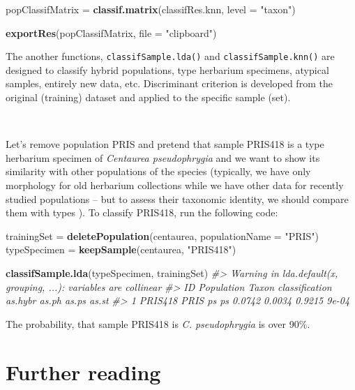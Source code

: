 \documentclass[
]{article}
\newenvironment{Shaded}{\begin{snugshade}}{\end{snugshade}}
\newcommand{\CommentTok}[1]{\textcolor[rgb]{0.56,0.35,0.01}{\textit{#1}}}
\newcommand{\DataTypeTok}[1]{\textcolor[rgb]{0.13,0.29,0.53}{#1}}
\newcommand{\KeywordTok}[1]{\textcolor[rgb]{0.13,0.29,0.53}{\textbf{#1}}}
\newcommand{\NormalTok}[1]{#1}
\newcommand{\StringTok}[1]{\textcolor[rgb]{0.31,0.60,0.02}{#1}}
\begin{document}
\begin{Shaded}
\begin{Highlighting}[]
\NormalTok{popClassifMatrix =}\StringTok{ }\KeywordTok{classif.matrix}\NormalTok{(classifRes.knn, }\DataTypeTok{level =} \StringTok{"taxon"}\NormalTok{)}

\KeywordTok{exportRes}\NormalTok{(popClassifMatrix, }\DataTypeTok{file =} \StringTok{"clipboard"}\NormalTok{)}
\end{Highlighting}
\end{Shaded}

The another functions, \texttt{classifSample.lda()} and
\texttt{classifSample.knn()} are designed to classify hybrid
populations, type herbarium specimens, atypical samples, entirely new
data, etc. Discriminant criterion is developed from the original
(training) dataset and applied to the specific sample (set).

~

Let's remove population PRIS and pretend that sample PRIS418 is a type
herbarium specimen of \emph{Centaurea pseudophrygia} and we want to show
its similarity with other populations of the species (typically, we have
only morphology for old herbarium collections while we have other data
for recently studied populations -- but to assess their taxonomic
identity, we should compare them with types ). To classify PRIS418, run
the following code:

\begin{Shaded}
\begin{Highlighting}[]
\NormalTok{trainingSet =}\StringTok{ }\KeywordTok{deletePopulation}\NormalTok{(centaurea, }\DataTypeTok{populationName =} \StringTok{"PRIS"}\NormalTok{)}
\NormalTok{typeSpecimen =}\StringTok{ }\KeywordTok{keepSample}\NormalTok{(centaurea, }\StringTok{"PRIS418"}\NormalTok{)}

\KeywordTok{classifSample.lda}\NormalTok{(typeSpecimen, trainingSet)}
\CommentTok{#> Warning in lda.default(x, grouping, ...): variables are collinear}
\CommentTok{#>        ID Population Taxon classification as.hybr  as.ph  as.ps as.st}
\CommentTok{#> 1 PRIS418       PRIS    ps             ps  0.0742 0.0034 0.9215 9e-04}
\end{Highlighting}
\end{Shaded}

The probability, that sample PRIS418 is \emph{C. pseudophrygia} is over
90\%.

\hypertarget{further-reading}{%
\section{Further reading}\label{further-reading}}
\end{document}
